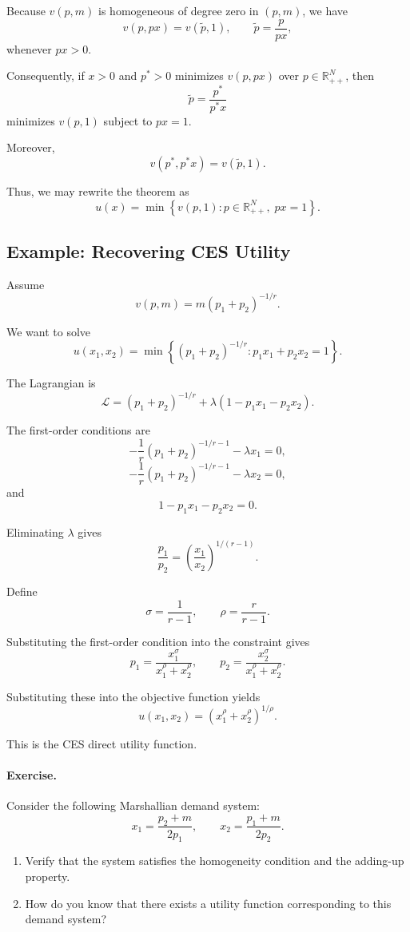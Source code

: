 Because \(v(p,m)\) is homogeneous of degree zero in \((p,m)\), we have
\[
v(p,px)
=
v(\tilde p,1),
\qquad
\tilde p=\frac{p}{px},
\]
whenever \(px>0\).

Consequently, if \(x>0\) and \(p^*>0\) minimizes \(v(p,px)\) over \(p\in \mathbb{R}_{++}^N\), then
\[
\tilde p
=
\frac{p^*}{p^*x}
\]
minimizes \(v(p,1)\) subject to \(px=1\).

Moreover,
\[
v(p^*,p^*x)
=
v(\tilde p,1).
\]

Thus, we may rewrite the theorem as
\[
u(x)
=
\min
\left\{
v(p,1)
:
p\in \mathbb{R}_{++}^N,
\;
px=1
\right\}.
\]

\subsection{Example: Recovering CES Utility}

Assume
\[
v(p,m)
=
m(p_1+p_2)^{-1/r}.
\]

We want to solve
\[
u(x_1,x_2)
=
\min
\left\{
(p_1+p_2)^{-1/r}
:
p_1x_1+p_2x_2=1
\right\}.
\]

The Lagrangian is
\[
\mathcal{L}
=
(p_1+p_2)^{-1/r}
+
\lambda(1-p_1x_1-p_2x_2).
\]

The first-order conditions are
\[
-\frac{1}{r}(p_1+p_2)^{-1/r-1}
-
\lambda x_1
=
0,
\]
\[
-\frac{1}{r}(p_1+p_2)^{-1/r-1}
-
\lambda x_2
=
0,
\]
and
\[
1-p_1x_1-p_2x_2=0.
\]

Eliminating \(\lambda\) gives
\[
\frac{p_1}{p_2}
=
\left(
\frac{x_1}{x_2}
\right)^{1/(r-1)}.
\]

Define
\[
\sigma=\frac{1}{r-1},
\qquad
\rho=\frac{r}{r-1}.
\]

Substituting the first-order condition into the constraint gives
\[
p_1
=
\frac{x_1^\sigma}{x_1^\rho+x_2^\rho},
\qquad
p_2
=
\frac{x_2^\sigma}{x_1^\rho+x_2^\rho}.
\]

Substituting these into the objective function yields
\[
u(x_1,x_2)
=
(x_1^\rho+x_2^\rho)^{1/\rho}.
\]

This is the CES direct utility function.

\paragraph{Exercise.}
Consider the following Marshallian demand system:
\[
x_1
=
\frac{p_2+m}{2p_1},
\qquad
x_2
=
\frac{p_1+m}{2p_2}.
\]

\begin{enumerate}
    \item[(A)] Verify that the system satisfies the homogeneity condition and the adding-up property.
    \item[(B)] How do you know that there exists a utility function corresponding to this demand system?
\end{enumerate}

